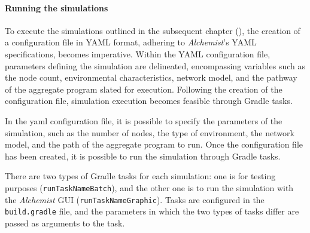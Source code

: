 \paragraph{Running the simulations}
To execute the simulations outlined in the subsequent chapter (), the creation of a
configuration file in YAML format, adhering to \emph{Alchemist}'s YAML specifications, becomes imperative.
Within the YAML configuration file, parameters defining the simulation are delineated, encompassing variables such as
the node count, environmental characteristics, network model, and the pathway of the aggregate program slated for execution.
Following the creation of the configuration file, simulation execution becomes feasible through Gradle tasks.

In the yaml configuration file, it is possible to specify the parameters of the simulation, such as the number of nodes,
the type of environment, the network model, and the path of the aggregate program to run.
Once the configuration file has been created, it is possible to run the simulation through Gradle tasks.

There are two types of Gradle tasks for each simulation: one is for testing purposes (\texttt{runTaskNameBatch}), and the other
one is to run the simulation with the \emph{Alchemist} GUI (\texttt{runTaskNameGraphic}).
Tasks are configured in the \texttt{build.gradle} file, and the parameters in which the two types of tasks differ are
passed as arguments to the task.